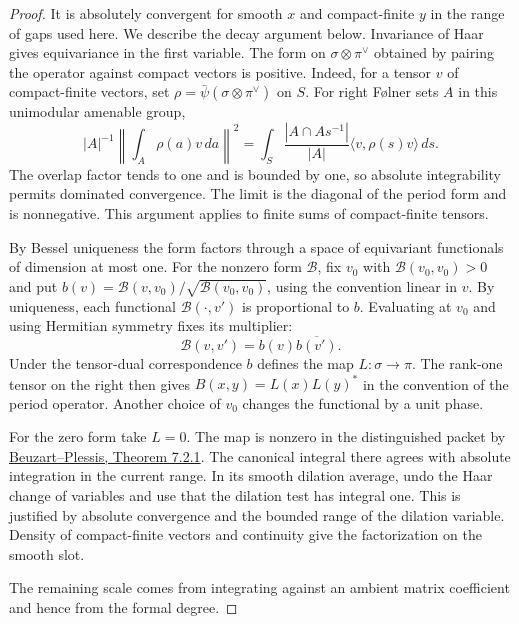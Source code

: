 \begin{proof}

It is absolutely convergent for smooth \(x\) and compact-finite
\(y\) in the range of gaps used here. We describe the decay
argument below. Invariance of Haar gives equivariance in the
first variable. The form on \(\sigma\otimes\pi^\vee\) obtained
by pairing the operator against compact vectors is positive.
Indeed, for a tensor \(v\) of compact-finite vectors, set
\(\rho=\bar\psi(\sigma\otimes\pi^\vee)\) on \(S\). For right
F\o lner sets \(A\) in this unimodular amenable group,
\[
 |A|^{-1}\left\|\int_A\rho(a)v\,da\right\|^2
 =\int_S \frac{|A\cap As^{-1}|}{|A|}
                   \langle v,\rho(s)v\rangle\,ds.
\]
The overlap factor tends to one and is bounded by one, so
absolute integrability permits dominated convergence. The limit
is the diagonal of the period form and is nonnegative. This
argument applies to finite sums of compact-finite tensors.

By Bessel uniqueness the form factors through a space of
equivariant functionals of dimension at most one. For the nonzero form \(\mathcal B\), fix \(v_0\) with
\(\mathcal B(v_0,v_0)>0\) and put
\(b(v)=\mathcal B(v,v_0)/\sqrt{\mathcal B(v_0,v_0)}\),
using the convention linear in \(v\).
By uniqueness, each functional \(\mathcal B(\cdot,v')\)
is proportional to \(b\). Evaluating at \(v_0\) and using
Hermitian symmetry fixes its multiplier:
\[
                \mathcal B(v,v')=b(v)\overline{b(v')}.
\]
Under the tensor-dual correspondence \(b\) defines the
map \(L:\sigma\to\pi\). The rank-one tensor on the right
then gives \(B(x,y)=L(x)L(y)^*\) in the convention of
the period operator. Another choice of \(v_0\) changes the
functional by a unit phase.

For the zero form take \(L=0\). The map is
nonzero in the distinguished packet by
\href{https://arxiv.org/pdf/1506.01452#page=181}{Beuzart--Plessis, Theorem 7.2.1}.
The canonical integral there agrees with absolute integration
in the current range. In its smooth dilation average, undo the
Haar change of variables and use that the dilation test has
integral one. This is justified by absolute convergence and the
bounded range of the dilation variable. Density of compact-finite
vectors and continuity give the factorization on the smooth slot.


The remaining scale comes from integrating against an ambient matrix coefficient and hence from the formal degree.



\end{proof}
